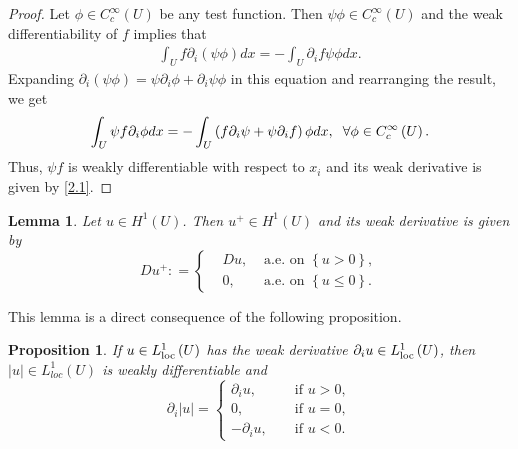 \documentclass[11pt,a4paper,center,notitlepage]{article}
\numberwithin{equation}{section}
\newtheorem{lemma}{Lemma}[section]
\newtheorem{prop}{Proposition}[section]
\begin{document}
\begin{proof}
Let $\phi \in C_c^\infty \left(U\right)$ be any test function. Then $\psi \phi \in C_c^\infty \left(U\right)$ and the weak differentiability of $f$ implies that
\begin{align}
\int_U {f{\partial _i}\left( {\psi \phi } \right)dx}  =  - \int_U {{\partial _i}f\psi \phi dx} .
\end{align}
Expanding ${\partial _i}\left( {\psi \phi } \right) = \psi {\partial _i}\phi  + {\partial _i}\psi \phi $ in this equation and rearranging the result, we get
\begin{align}
\int_U {\psi f{\partial _i}\phi dx}  =  - \int_U {\left( {f{\partial _i}\psi  + \psi {\partial _i}f} \right)\phi dx} ,\hspace{2mm} \forall \phi  \in C_c^\infty \left( U \right).
\end{align}
Thus, $\psi f$ is weakly differentiable with respect to $x_i$ and its weak derivative is given by \eqref{2.1}.
\end{proof}

\begin{lemma}\label{lemma1.2}
Let $u\in H^1\left(U\right)$. Then $u^+ \in H^1\left(U\right)$ and its weak derivative is given by
\begin{equation}
D{u^ + }: = \left\{ \begin{split}
& Du, & \mbox{ a.e. on } \left\{ {u > 0} \right\},\\
& 0, & \mbox{ a.e. on } \left\{ {u \le 0} \right\}.
\end{split} \right.
\end{equation}
\end{lemma}
This lemma is a direct consequence of the following proposition. 
\begin{prop}\label{prop2.1}
If $u\in L_{\rm loc}^1 \left(U\right)$ has the weak derivative $\partial _i u\in L_{\rm loc}^1\left(U\right)$, then $\left| u \right| \in L_{loc}^1\left( U \right)$ is weakly differentiable and 
\begin{equation}
\label{2.5*}
{\partial _i}\left| u \right| = \left\{ \begin{split}
{\partial _i}u,& & \mbox{ if } u > 0,\\
0,& & \mbox{ if } u = 0,\\
 - {\partial _i}u,& & \mbox{ if } u < 0.
\end{split} \right.
\end{equation}
\end{prop}
\end{document}
